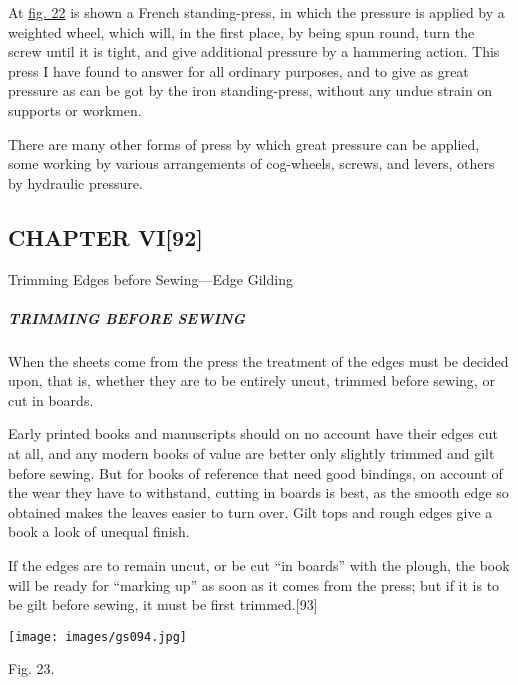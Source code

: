 \documentclass[
]{article}
\begin{document}
At \protect\hyperlink{Fig_22}{fig. 22} is shown a French standing-press,
in which the pressure is applied by a weighted wheel, which will, in the
first place, by being spun round, turn the screw until it is tight, and
give additional pressure by a hammering action. This press I have found
to answer for all ordinary purposes, and to give as great pressure as
can be got by the iron standing-press, without any undue strain on
supports or workmen.

There are many other forms of press by which great pressure can be
applied, some working by various arrangements of cog-wheels, screws, and
levers, others by hydraulic pressure.

\hypertarget{chapter-vi92}{%
\subsection[CHAPTER
VI]{\texorpdfstring{\protect\hypertarget{CHAPTER_VI}{}{}CHAPTER
VI{\protect\hypertarget{Page_92}{}{{[}92{]}}}}{CHAPTER VI{[}92{]}}}\label{chapter-vi92}}

Trimming Edges before Sewing---Edge Gilding

\hypertarget{trimming-before-sewing}{%
\subparagraph{TRIMMING BEFORE SEWING}\label{trimming-before-sewing}}

{When} the sheets come from the press the treatment of the edges must be
decided upon, that is, whether they are to be entirely uncut, trimmed
before sewing, or cut in boards.

Early printed books and manuscripts should on no account have their
edges cut at all, and any modern books of value are better only slightly
trimmed and gilt before sewing. But for books of reference that need
good bindings, on account of the wear they have to withstand, cutting in
boards is best, as the smooth edge so obtained makes the leaves easier
to turn over. Gilt tops and rough edges give a book a look of unequal
finish.

If the edges are to remain uncut, or be cut ``in boards'' with the
plough, the book will be ready for ``marking up'' as soon as it comes
from the press; but if it is to be gilt before sewing, it must be first
trimmed.{\protect\hypertarget{Page_93}{}{{[}93{]}}}

\protect\hypertarget{Fig_23}{}{}
\texttt{[image: images/gs094.jpg]}

Fig. 23.
\end{document}
